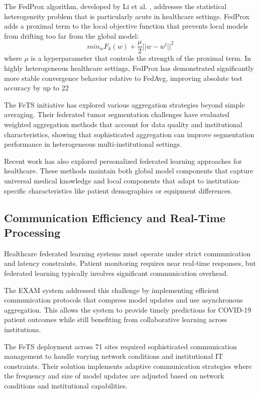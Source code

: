 \documentclass[3p,times,procedia]{elsarticle}
\begin{document}
The FedProx algorithm, developed by Li et al. \cite{Li2020}, addresses the statistical heterogeneity problem that is particularly acute in healthcare settings. FedProx adds a proximal term to the local objective function that prevents local models from drifting too far from the global model:
$$min_wF_k(w) + \frac{\mu}{2}||w - w^t||^2$$
where $\mu$ is a hyperparameter that controls the strength of the proximal term. In highly heterogeneous healthcare settings, FedProx has demonstrated significantly more stable convergence behavior relative to FedAvg, improving absolute test accuracy by up to 22%

The FeTS initiative has explored various aggregation strategies beyond simple averaging. Their federated tumor segmentation challenges \cite{Pati2021} have evaluated weighted aggregation methods that account for data quality and institutional characteristics, showing that sophisticated aggregation can improve segmentation performance in heterogeneous multi-institutional settings.

Recent work has also explored personalized federated learning approaches for healthcare. These methods maintain both global model components that capture universal medical knowledge and local components that adapt to institution-specific characteristics like patient demographics or equipment differences.

\subsection{Communication Efficiency and Real-Time Processing}

Healthcare federated learning systems must operate under strict communication and latency constraints. Patient monitoring requires near real-time responses, but federated learning typically involves significant communication overhead.

The EXAM system addressed this challenge by implementing efficient communication protocols that compress model updates and use asynchronous aggregation. This allows the system to provide timely predictions for COVID-19 patient outcomes while still benefiting from collaborative learning across institutions.

The FeTS deployment across 71 sites required sophisticated communication management to handle varying network conditions and institutional IT constraints. Their solution implements adaptive communication strategies where the frequency and size of model updates are adjusted based on network conditions and institutional capabilities.
\end{document}
